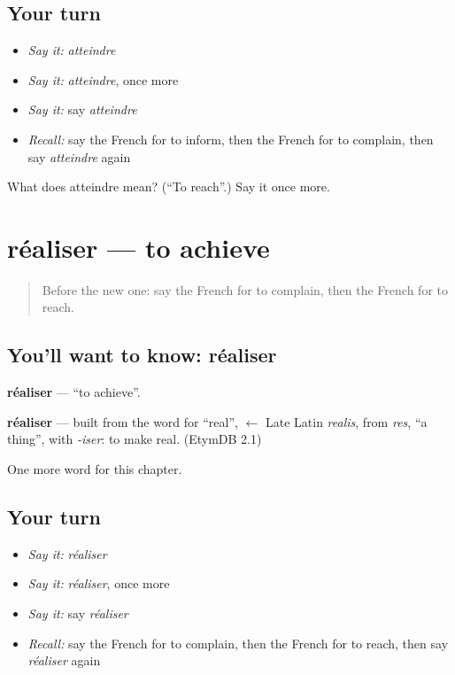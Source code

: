 \subsection*{Your turn}
\begin{itemize}
\raggedright
  \item \emph{Say it:} \emph{atteindre}
  \item \emph{Say it:} \emph{atteindre}, once more
  \item \emph{Say it:} say \emph{atteindre}
  \item \emph{Recall:} say the French for to inform, then the French for to complain, then say \emph{atteindre} again
\end{itemize}

\begin{tcolorbox}[breakable,colback=teal!4,colframe=teal!35!black,title={Before you move on}]
What does atteindre mean? (\textquotedblleft{}To reach\textquotedblright{}.) Say it once more.
\end{tcolorbox}
\section[réaliser]{réaliser — to achieve}

\label{lesson:FR-C210-realiser}



\begin{quote}
Before the new one: say the French for to complain, then the French for to reach.
\end{quote}

\subsection*{You'll want to know: réaliser}
\textbf{réaliser} — \textquotedblleft{}to achieve\textquotedblright{}.

\begin{cousinweb}
\textbf{réaliser} — built from the word for \textquotedblleft{}real\textquotedblright{}, $\leftarrow$ Late Latin \emph{realis}, from \emph{res}, \textquotedblleft{}a thing\textquotedblright{}, with \emph{-iser}: to make real. (EtymDB 2.1)
\end{cousinweb}

\begin{grammarlens}[title={What you've built}]
One more word for this chapter.
\end{grammarlens}

\subsection*{Your turn}
\begin{itemize}
\raggedright
  \item \emph{Say it:} \emph{réaliser}
  \item \emph{Say it:} \emph{réaliser}, once more
  \item \emph{Say it:} say \emph{réaliser}
  \item \emph{Recall:} say the French for to complain, then the French for to reach, then say \emph{réaliser} again
\end{itemize}

